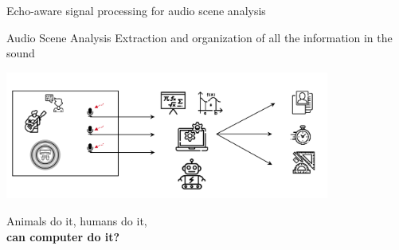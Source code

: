 \begin{frame}[t]{Echo-aware signal processing for \alert{audio scene analysis}}
    \vfill
    \begin{mydefblock}{Audio Scene Analysis}
        Extraction and organization of all the information in the sound
    \end{mydefblock}

    \vfill
    \begin{center}
        \includegraphics[width=0.8\textwidth]{figures/scene_analysis.png}
    \end{center}

    Animals do it, humans do it,
    \\\hfill\textcolor{myred}{\textbf{can computer do it?}}

\end{frame}

